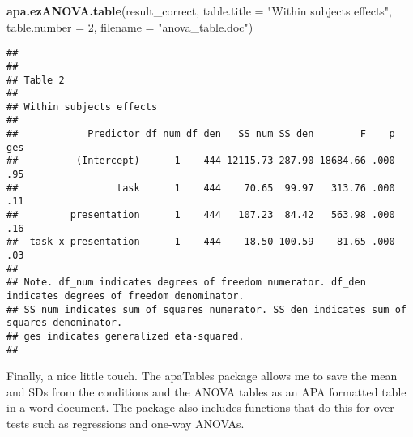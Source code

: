 \documentclass[]{article}
\newenvironment{Shaded}{\begin{snugshade}}{\end{snugshade}}
\newcommand{\KeywordTok}[1]{\textcolor[rgb]{0.13,0.29,0.53}{\textbf{#1}}}
\newcommand{\DataTypeTok}[1]{\textcolor[rgb]{0.13,0.29,0.53}{#1}}
\newcommand{\DecValTok}[1]{\textcolor[rgb]{0.00,0.00,0.81}{#1}}
\newcommand{\StringTok}[1]{\textcolor[rgb]{0.31,0.60,0.02}{#1}}
\newcommand{\NormalTok}[1]{#1}
\begin{document}
\begin{Shaded}
\begin{Highlighting}[]
\KeywordTok{apa.ezANOVA.table}\NormalTok{(result_correct, }\DataTypeTok{table.title =} \StringTok{"Within subjects effects"}\NormalTok{, }\DataTypeTok{table.number =} \DecValTok{2}\NormalTok{, }\DataTypeTok{filename =} \StringTok{"anova_table.doc"}\NormalTok{)}
\end{Highlighting}
\end{Shaded}

\begin{verbatim}
## 
## 
## Table 2 
## 
## Within subjects effects 
## 
##            Predictor df_num df_den   SS_num SS_den        F    p ges
##          (Intercept)      1    444 12115.73 287.90 18684.66 .000 .95
##                 task      1    444    70.65  99.97   313.76 .000 .11
##         presentation      1    444   107.23  84.42   563.98 .000 .16
##  task x presentation      1    444    18.50 100.59    81.65 .000 .03
## 
## Note. df_num indicates degrees of freedom numerator. df_den indicates degrees of freedom denominator. 
## SS_num indicates sum of squares numerator. SS_den indicates sum of squares denominator. 
## ges indicates generalized eta-squared.
## 
\end{verbatim}

Finally, a nice little touch. The apaTables package allows me to save
the mean and SDs from the conditions and the ANOVA tables as an APA
formatted table in a word document. The package also includes functions
that do this for over tests such as regressions and one-way ANOVAs.
\end{document}
